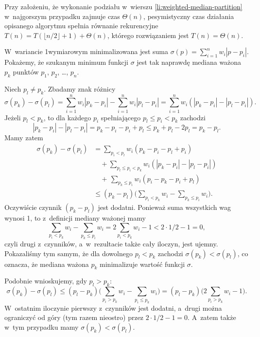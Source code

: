 Przy założeniu, że wykonanie podziału w~wierszu \ref{li:weighted-median-partition} w~najgorszym przypadku zajmuje czas $\Theta(n)$, pesymistyczny czas działania opisanego algorytmu spełnia równanie rekurencyjne $T(n)=T(\lfloor n/2\rfloor+1)+\Theta(n)$, którego rozwiązaniem jest $T(n)=\Theta(n)$.

\subproblem %
W~wariancie 1\nbhyphen wymiarowym minimalizowana jest suma $\sigma(p)=\sum_{i=1}^nw_i|p-p_i|$.
Pokażemy, że szukanym minimum funkcji $\sigma$ jest tak naprawdę mediana ważona $p_k$ punktów $p_1$, $p_2$, \dots, $p_n$.

Niech $p_l\ne p_k$.
Zbadamy znak różnicy
\[
    \sigma(p_k)-\sigma(p_l) = \sum_{i=1}^nw_i|p_k-p_i|-\sum_{i=1}^nw_i|p_l-p_i| = \sum_{i=1}^nw_i(|p_k-p_i|-|p_l-p_i|).
\]
Jeżeli $p_l<p_k$, to dla każdego $p_i$ spełniającego $p_l\le p_i<p_k$ zachodzi
\[
    |p_k-p_i|-|p_l-p_i|=p_k-p_i-p_i+p_l\le p_k+p_l-2p_l=p_k-p_l.
\]
Mamy zatem
\begin{align*}
    \sigma(p_k)-\sigma(p_l) &= \sum_{p_i<p_l}w_i(p_k-p_i-p_l+p_i) \\
	&\quad {}+\!\!\!\sum_{p_l\le p_i<p_k}\!\!\!\!w_i(|p_k-p_i|-|p_l-p_i|) \\
	&\quad {}+\,\sum_{p_k\le p_i}w_i(p_i-p_k-p_i+p_l) \\
	&\le (p_k-p_l)\biggl(\sum_{p_i<p_k}w_i-\sum_{p_k\le p_i}w_i\biggr).
\end{align*}
Oczywiście czynnik $(p_k-p_l)$ jest dodatni.
Ponieważ suma wszystkich wag wynosi 1, to z~definicji mediany ważonej mamy
\[
    \sum_{p_i<p_k}w_i-\sum_{p_k\le p_i}w_i = 2\sum_{p_i<p_k}w_i-1 < 2\cdot1/2-1 = 0,
\]
czyli drugi z~czynników, a~w~rezultacie także cały iloczyn, jest ujemny.
Pokazaliśmy tym samym, że dla dowolnego $p_l<p_k$ zachodzi $\sigma(p_k)<\sigma(p_l)$, co oznacza, że mediana ważona $p_k$ minimalizuje wartość funkcji $\sigma$.

Podobnie wnioskujemy, gdy $p_l>p_k$:
\[
    \sigma(p_k)-\sigma(p_l) \le (p_l-p_k)\biggl(\sum_{p_i>p_k}w_i-\sum_{p_i\le p_k}w_i\biggr) = (p_l-p_k)\biggl(2\sum_{p_i>p_k}w_i-1\biggr).
\]
W~ostatnim iloczynie pierwszy z~czynników jest dodatni, a~drugi można ograniczyć od góry (tym razem nieostro) przez $2\cdot1/2-1=0$.
A~zatem także w~tym przypadku mamy $\sigma(p_k)<\sigma(p_l)$.

\subproblem %

